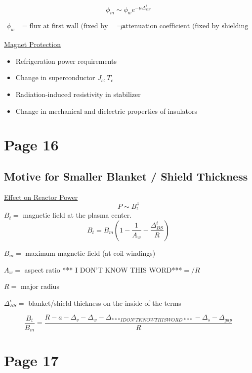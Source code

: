 \documentclass[11pt]{report} %
\newcommand{\IDK}{*** I DON'T KNOW THIS WORD***}
\begin{document}
\begin{equation}
\phi_m \sim \phi_w e^{-\mu \Delta_{BS}^i}
\end{equation}


\begin{align}
\phi_w & = \text{flux at first wall (fixed by design)}
\mu & = \text{attenuation coefficient (fixed by shielding composition)}
\end{align}

\underline{Magnet Protection}
\begin{itemize}
\item Refrigeration power requirements
\item Change in superconductor $J_c,T_c$
\item Radiation-induced resistivity in stabilizer
\item Change in mechanical and dielectric properties of insulators
\end{itemize}

\section{Page 16}
\subsection{Motive for Smaller Blanket / Shield Thickness}
\underline{Effect on Reactor Power}
\begin{equation}
  P \sim B_t^4
\end{equation}
$B_t = $ magnetic field at the plasma center.
\begin{equation}
  B_t = B_m \left( 1 - \frac{1}{A_w} - \frac{\Delta_{BS}^i}{R} \right)
\end{equation}

$B_m = $ maximum magnetic field (at coil windings)

$A_w = $ aspect ratio \IDK $ = /R$

$R = $ major radius

$\Delta_{BS}^i = $ blanket/shield thickness on the inside of the terms

\begin{equation}
  \frac{B_t}{B_m} = \frac{R-a-\Delta_v - \Delta_{w} - \Delta_{\IDK} - \Delta_s - \Delta_{gap}}{R}
\end{equation}

\section{Page 17}
\end{document}
